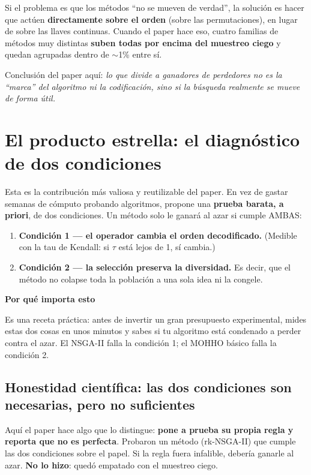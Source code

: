\documentclass[11pt]{article}
\newcommand{\cajacolor}{cajadato}
\newenvironment{caja}[2]{%
  \par\medskip\noindent
  \renewcommand{\cajacolor}{#1}%
  \begin{lrbox}{\cajabox}%
  \begin{minipage}{\dimexpr\linewidth-2\fboxsep-1.2em\relax}%
  \setlength{\parskip}{0.5em}%
  {\bfseries\color{acento2}#2}\par\smallskip}
  {\end{minipage}%
  \end{lrbox}%
  \setlength{\fboxsep}{0.6em}%
  \colorbox{\cajacolor}{\usebox{\cajabox}}\par\medskip}
\newcommand{\term}[1]{\textbf{\color{acento}#1}}
\begin{document}
Si el problema es que los métodos ``no se mueven de verdad'', la solución es hacer que actúen \textbf{directamente sobre el orden} (sobre las permutaciones), en lugar de sobre las llaves continuas. Cuando el paper hace eso, cuatro familias de métodos muy distintas \textbf{suben todas por encima del muestreo ciego} y quedan agrupadas dentro de $\sim$1\% entre sí.

Conclusión del paper aquí: \emph{lo que divide a ganadores de perdedores no es la ``marca'' del algoritmo ni la codificación, sino si la búsqueda realmente se mueve de forma útil.}

\section{El producto estrella: el diagnóstico de dos condiciones}

Esta es la contribución más valiosa y reutilizable del paper. En vez de gastar semanas de cómputo probando algoritmos, propone una \term{prueba barata, a priori}, de dos condiciones. Un método solo le ganará al azar si cumple AMBAS:

\begin{enumerate}[leftmargin=1.6em]
  \item \term{Condición 1 --- el operador cambia el orden decodificado.} (Medible con la tau de Kendall: si $\tau$ está lejos de 1, sí cambia.)
  \item \term{Condición 2 --- la selección preserva la diversidad.} Es decir, que el método no colapse toda la población a una sola idea ni la congele.
\end{enumerate}

\begin{caja}{cajadato}{Por qué importa esto}
Es una receta práctica: antes de invertir un gran presupuesto experimental, mides estas dos cosas en unos minutos y sabes si tu algoritmo está condenado a perder contra el azar. El NSGA-II falla la condición 1; el MOHHO básico falla la condición 2.
\end{caja}

\subsection{Honestidad científica: las dos condiciones son necesarias, pero no suficientes}

Aquí el paper hace algo que lo distingue: \textbf{pone a prueba su propia regla y reporta que no es perfecta}. Probaron un método (rk-NSGA-II) que cumple las dos condiciones sobre el papel. Si la regla fuera infalible, debería ganarle al azar. \textbf{No lo hizo}: quedó empatado con el muestreo ciego.
\end{document}
